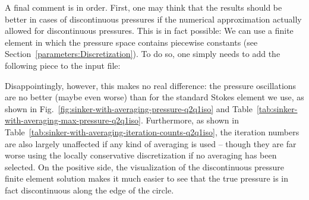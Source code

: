 \documentclass{article}
\begin{document}
A final comment is in order. First, one may think that the results should be
better in cases of discontinuous pressures if the numerical approximation
actually allowed for discontinuous pressures. This is in fact possible: We can
use a finite element in which the pressure space contains piecewise constants
(see Section~\ref{parameters:Discretization}). To do so, one simply needs to add
the following piece to the input file:

Disappointingly, however, this makes no real difference: the pressure
oscillations are no better (maybe even worse) than for the standard Stokes
element we use, as shown in
Fig.~\ref{fig:sinker-with-averaging-pressure-q2q1iso} and
Table~\ref{tab:sinker-with-averaging-max-pressure-q2q1iso}. Furthermore, as
shown in Table~\ref{tab:sinker-with-averaging-iteration-counts-q2q1iso}, the
iteration numbers are also largely unaffected if any kind of averaging is used
-- though they are far worse using the locally conservative discretization if no
averaging has been selected. On the positive side, the visualization of the
discontinuous pressure finite element solution makes it much easier to see
that the true pressure is in fact discontinuous along the edge of the circle.
\end{document}
